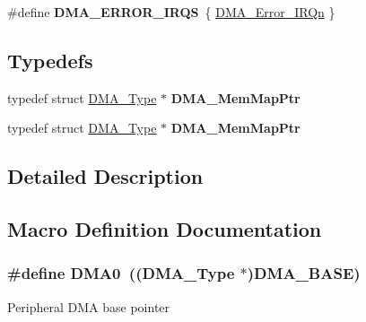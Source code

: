 \begin{DoxyCompactItemize}
\item 
\#define {\bfseries D\+M\+A\+\_\+\+E\+R\+R\+O\+R\+\_\+\+I\+R\+QS}~\{ \hyperlink{group__Interrupt__vector__numbers_gga666eb0caeb12ec0e281415592ae89083a50a6180bca228af425f6fcbf44a7ec08}{D\+M\+A\+\_\+\+Error\+\_\+\+I\+R\+Qn} \}\hypertarget{group__DMA__Peripheral__Access__Layer_ga459be3deca4751dea08e9046cd437c53}{}\label{group__DMA__Peripheral__Access__Layer_ga459be3deca4751dea08e9046cd437c53}

\end{DoxyCompactItemize}
\subsection*{Typedefs}
\begin{DoxyCompactItemize}
\item 
typedef struct \hyperlink{structDMA__Type}{D\+M\+A\+\_\+\+Type} $\ast$ {\bfseries D\+M\+A\+\_\+\+Mem\+Map\+Ptr}\hypertarget{group__DMA__Peripheral__Access__Layer_gaf500b02a8cf36350d74bcb8c7a924b5d}{}\label{group__DMA__Peripheral__Access__Layer_gaf500b02a8cf36350d74bcb8c7a924b5d}

\item 
typedef struct \hyperlink{structDMA__Type}{D\+M\+A\+\_\+\+Type} $\ast$ {\bfseries D\+M\+A\+\_\+\+Mem\+Map\+Ptr}\hypertarget{group__DMA__Peripheral__Access__Layer_gaf500b02a8cf36350d74bcb8c7a924b5d}{}\label{group__DMA__Peripheral__Access__Layer_gaf500b02a8cf36350d74bcb8c7a924b5d}

\end{DoxyCompactItemize}


\subsection{Detailed Description}


\subsection{Macro Definition Documentation}
\subsubsection[{\texorpdfstring{D\+M\+A0}{DMA0}}]{\setlength{\rightskip}{0pt plus 5cm}\#define D\+M\+A0~(({\bf D\+M\+A\+\_\+\+Type} $\ast$){\bf D\+M\+A\+\_\+\+B\+A\+SE})}\hypertarget{group__DMA__Peripheral__Access__Layer_ga4103044f9ca209772f513dc694513ffb}{}\label{group__DMA__Peripheral__Access__Layer_ga4103044f9ca209772f513dc694513ffb}
Peripheral D\+MA base pointer 
